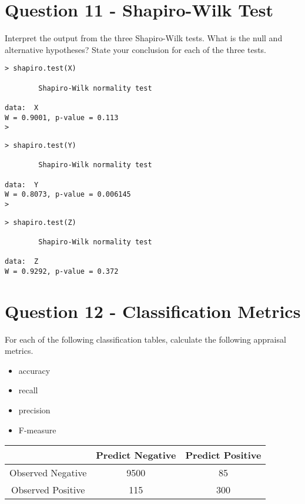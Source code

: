 \documentclass[a4paper,12pt]{article}
\begin{document}
\section*{Question 11 - Shapiro-Wilk Test}
Interpret the output from the three Shapiro-Wilk tests. What is the null and alternative hypotheses? State your conclusion for each of the three tests.
\begin{framed}
\begin{verbatim}
> shapiro.test(X)

        Shapiro-Wilk normality test

data:  X
W = 0.9001, p-value = 0.113
>
\end{verbatim}
\end{framed}
\begin{framed}
\begin{verbatim}
> shapiro.test(Y)

        Shapiro-Wilk normality test

data:  Y 
W = 0.8073, p-value = 0.006145
>
\end{verbatim}
\end{framed}
\begin{framed}
\begin{verbatim}
> shapiro.test(Z)

        Shapiro-Wilk normality test

data:  Z
W = 0.9292, p-value = 0.372
\end{verbatim}
\end{framed}
\newpage
\section*{Question 12 - Classification Metrics}
For each of the following classification tables, calculate the following appraisal metrics.
\begin{multicols}{2}
\begin{itemize}	
\item 	accuracy  
\item 	recall
\item 	precision
\item 	F-measure
\end{itemize}
\end{multicols}
	



\begin{center}
\begin{tabular}{|c|c|c|}
\hline  & Predict Negative & Predict Positive \\ 
\hline Observed Negative &	9500	&	85	\\ 
\hline Observed Positive & 	115	&	300	\\ 
\hline 
\end{tabular} 
\end{center}
\end{document}
